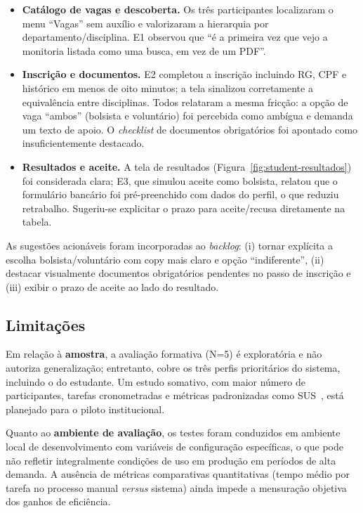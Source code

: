 \documentclass[portuguese]{sbc2025}%
\begin{document}
\begin{itemize}
  \item \textbf{Catálogo de vagas e descoberta.} Os três participantes localizaram o menu ``Vagas'' sem auxílio e valorizaram a hierarquia por departamento/disciplina. E1 observou que ``é a primeira vez que vejo a monitoria listada como uma busca, em vez de um PDF''.
  \item \textbf{Inscrição e documentos.} E2 completou a inscrição incluindo RG, CPF e histórico em menos de oito minutos; a tela sinalizou corretamente a equivalência entre disciplinas. Todos relataram a mesma fricção: a opção de vaga ``ambos'' (bolsista e voluntário) foi percebida como ambígua e demanda um texto de apoio. O \textit{checklist} de documentos obrigatórios foi apontado como insuficientemente destacado.
  \item \textbf{Resultados e aceite.} A tela de resultados (Figura~\ref{fig:student-resultados}) foi considerada clara; E3, que simulou aceite como bolsista, relatou que o formulário bancário foi pré-preenchido com dados do perfil, o que reduziu retrabalho. Sugeriu-se explicitar o prazo para aceite/recusa diretamente na tabela.
\end{itemize}

As sugestões acionáveis foram incorporadas ao \textit{backlog}: (i) tornar explícita a escolha bolsista/voluntário com copy mais claro e opção ``indiferente'', (ii) destacar visualmente documentos obrigatórios pendentes no passo de inscrição e (iii) exibir o prazo de aceite ao lado do resultado.

\subsection{Limitações}

Em relação à \textbf{amostra}, a avaliação formativa (N=5) é exploratória e não autoriza generalização; entretanto, cobre os três perfis prioritários do sistema, incluindo o do estudante. Um estudo somativo, com maior número de participantes, tarefas cronometradas e métricas padronizadas como SUS~\cite{nielsen1994usability}, está planejado para o piloto institucional.

Quanto ao \textbf{ambiente de avaliação}, os testes foram conduzidos em ambiente local de desenvolvimento com variáveis de configuração específicas, o que pode não refletir integralmente condições de uso em produção em períodos de alta demanda. A ausência de métricas comparativas quantitativas (tempo médio por tarefa no processo manual \textit{versus} sistema) ainda impede a mensuração objetiva dos ganhos de eficiência.
\end{document}
